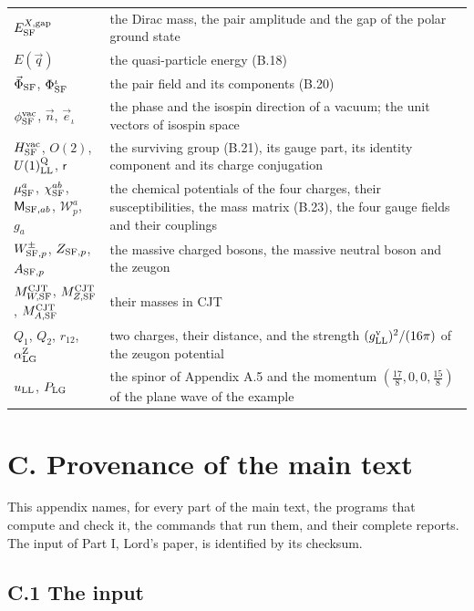 \documentclass[
  10pt,
]{article}
\begin{document}
\begin{longtable}[]{@{}
  >{\raggedright\arraybackslash}p{}
  >{\raggedright\arraybackslash}p{}@{}}
\(E^{X,{\rm gap}}_{\rm SF}\) & the Dirac mass, the pair amplitude and
the gap of the polar ground state \\
\(E(\vec q)\) & the quasi-particle energy (B.18) \\
\(\vec\Phi_{\rm SF}\), \(\Phi^\iota_{\rm SF}\) & the pair field and its
components (B.20) \\
\(\phi^{\rm vac}_{\rm SF}\), \(\vec n\), \(\vec e_\iota\) & the phase
and the isospin direction of a vacuum; the unit vectors of isospin
space \\
\(H^{\rm vac}_{\rm SF}\), \(O(2)\), \(U(1)^{\rm Q}_{\rm LL}\),
\(\mathsf r\) & the surviving group (B.21), its gauge part, its identity
component and its charge conjugation \\
\(\mu^a_{\rm SF}\), \(\chi^{ab}_{\rm SF}\), \(\mathsf M_{{\rm SF},ab}\),
\(\mathcal W^a_p\), \(g_a\) & the chemical potentials of the four
charges, their susceptibilities, the mass matrix (B.23), the four gauge
fields and their couplings \\
\(W^\pm_{{\rm SF},p}\), \(Z_{{\rm SF},p}\), \(A_{{\rm SF},p}\) & the
massive charged bosons, the massive neutral boson and the zeugon \\
\(M^{\rm CJT}_{W,{\rm SF}}\), \(M^{\rm CJT}_{Z,{\rm SF}}\),
\(M^{\rm CJT}_{A,{\rm SF}}\) & their masses in CJT \\
\(Q_1\), \(Q_2\), \(r_{12}\), \(\alpha^{\rm Z}_{\rm LG}\) & two charges,
their distance, and the strength \((g^{\rm v}_{\rm LL})^2/(16\pi)\) of
the zeugon potential \\
\(u_{\rm LL}\), \(P_{\rm LG}\) & the spinor of Appendix A.5 and the
momentum \((\tfrac{17}8,0,0,\tfrac{15}8)\) of the plane wave of the
example \\
\end{longtable}

\hypertarget{c.-provenance-of-the-main-text}{%
\section{C. Provenance of the main
text}\label{c.-provenance-of-the-main-text}}

This appendix names, for every part of the main text, the programs that
compute and check it, the commands that run them, and their complete
reports. The input of Part I, Lord's paper, is identified by its
checksum.

\hypertarget{c.1-the-input}{%
\subsection{C.1 The input}\label{c.1-the-input}}
\end{document}

